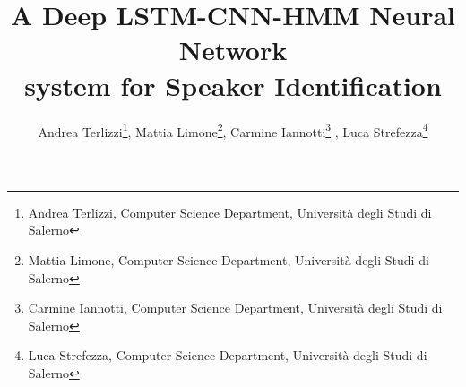 \documentclass[11pt,a4paper,oneside,twocolumn]{ieeeconf}
\begin{document}
	\author{
		Andrea Terlizzi\thanks{Andrea Terlizzi, Computer Science Department, Università degli Studi di Salerno},		
		Mattia Limone\thanks{Mattia Limone, Computer Science Department, Università degli Studi di Salerno}, 
		Carmine Iannotti\thanks{Carmine Iannotti, Computer Science Department, Università degli Studi di Salerno} ,  	
		Luca Strefezza\thanks{Luca Strefezza, Computer Science Department, Università degli Studi di Salerno}
		}	
	\title{A Deep LSTM-CNN-HMM Neural Network\\system for Speaker Identification}
	\maketitle
	
	
	
	
	
	
	
	
	
	
	
	
	
	
	\printbibliography[heading=bibintoc]
	
\end{document}
